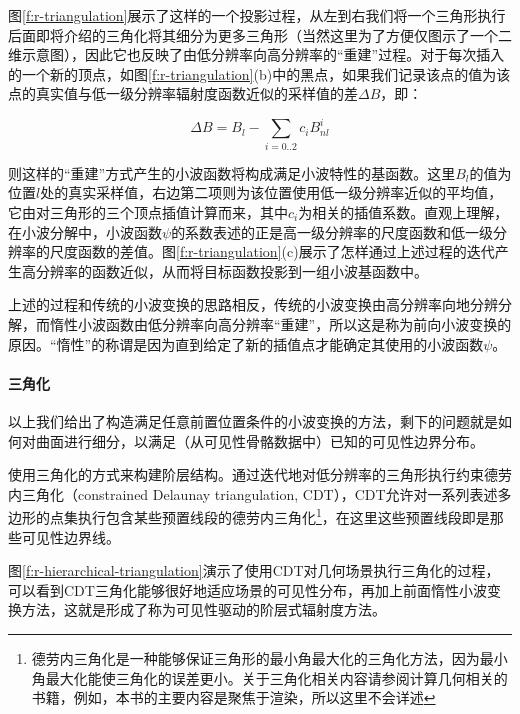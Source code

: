 图\ref{f:r-triangulation}展示了这样的一个投影过程，从左到右我们将一个三角形执行后面即将介绍的三角化将其细分为更多三角形（当然这里为了方便仅图示了一个二维示意图），因此它也反映了由低分辨率向高分辨率的“重建”过程。对于每次插入的一个新的顶点，如图\ref{f:r-triangulation}(b)中的黑点，如果我们记录该点的值为该点的真实值与低一级分辨率辐射度函数近似的采样值的差$\Delta B$，即：

\begin{equation}
	\Delta B=B_l-\sum_{i=0..2}c_iB^{i}_{nl}
\end{equation}

\noindent 则这样的“重建”方式产生的小波函数将构成满足小波特性的基函数。这里$B_l$的值为位置$l$处的真实采样值，右边第二项则为该位置使用低一级分辨率近似的平均值，它由对三角形的三个顶点插值计算而来，其中$c_i$为相关的插值系数。直观上理解，在小波分解中，小波函数$\psi$的系数表述的正是高一级分辨率的尺度函数和低一级分辨率的尺度函数的差值。图\ref{f:r-triangulation}(c)展示了怎样通过上述过程的迭代产生高分辨率的函数近似，从而将目标函数投影到一组小波基函数中。

上述的过程和传统的小波变换的思路相反，传统的小波变换由高分辨率向地分辨分解，而惰性小波函数由低分辨率向高分辨率“重建”，所以这是称为前向小波变换的原因。“惰性”的称谓是因为直到给定了新的插值点才能确定其使用的小波函数$\psi$。




\paragraph{三角化}
以上我们给出了构造满足任意前置位置条件的小波变换的方法，剩下的问题就是如何对曲面进行细分，以满足（从可见性骨骼数据中）已知的可见性边界分布。

\cite{a:FastandAccurateHierarchicalRadiosityUsingGlobalVisibility}使用三角化的方式来构建阶层结构。通过迭代地对低分辨率的三角形执行约束德劳内三角化（constrained Delaunay triangulation, CDT）\cite{a:Hierarchicaltriangulationformultiresolutionsurfacedescriptiongeometricdesign}，CDT允许对一系列表述多边形的点集执行包含某些预置线段的德劳内三角化\footnote{德劳内三角化是一种能够保证三角形的最小角最大化的三角化方法，因为最小角最大化能使三角化的误差更小。关于三角化相关内容请参阅计算几何相关的书籍，例如\cite{b:ComputiationalGeometry:AlgorithmsandApplications}，本书的主要内容是聚焦于渲染，所以这里不会详述}，在这里这些预置线段即是那些可见性边界线。

图\ref{f:r-hierarchical-triangulation}演示了使用CDT对几何场景执行三角化的过程，可以看到CDT三角化能够很好地适应场景的可见性分布，再加上前面惰性小波变换方法，这就是形成了称为可见性驱动的阶层式辐射度方法。

